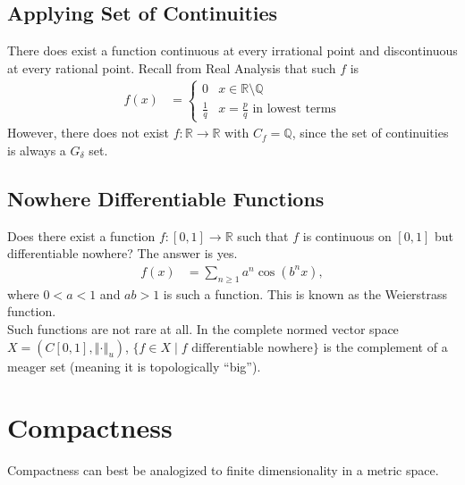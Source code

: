 \documentclass[8pt]{extarticle}
\newcommand{\Q}{\mathbb{Q}}
\newcommand{\R}{\mathbb{R}}
\newcommand{\norm}[1]{\left\Vert #1 \right\Vert}
\begin{document}
  \subsection{Applying Set of Continuities}%
  There does exist a function continuous at every irrational point and discontinuous at every rational point. Recall from Real Analysis that such $f$ is
  \begin{align*}
    f(x) &= \begin{cases}
      0 & x\in \R\setminus \Q\\
      \frac{1}{q} & x = \frac{p}{q}\text{ in lowest terms}
    \end{cases}
  \end{align*}
  However, there does not exist $f: \R\rightarrow \R$ with $C_f = \Q$, since the set of continuities is always a $G_{\delta}$ set.
  \subsection{Nowhere Differentiable Functions}%
  Does there exist a function $f: [0,1]\rightarrow \R$ such that $f$ is continuous on $[0,1]$ but differentiable nowhere? The answer is yes.
  \begin{align*}
    f(x) &= \sum_{n\geq 1} a^n\cos(b^n x),
  \end{align*}
  where $0 < a < 1$ and $ab > 1$ is such a function. This is known as the Weierstrass function.\\

  Such functions are not rare at all. In the complete normed vector space $X = (C[0,1],\norm{\cdot}_u)$, $\{f\in X\mid f\text{ differentiable nowhere}\}$ is the complement of a meager set (meaning it is topologically ``big'').
  \section{Compactness}%
  Compactness can best be analogized to finite dimensionality in a metric space.\\
\end{document}
